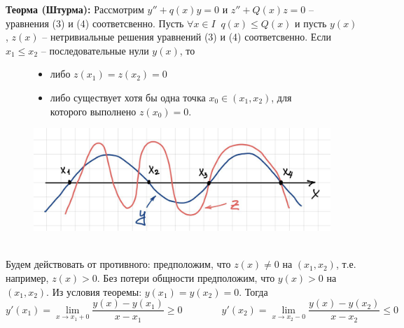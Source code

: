 \textbf{Теорма (Штурма):} Рассмотрим $y''+q(x)y=0$ и $z''+Q(x)z=0$ -- уравнения (3) и (4) соответсвенно.
\newline Пусть $\forall x\in I \;\; q(x)\leqslant Q(x)$ и пусть $y(x)$, $z(x)$ --
нетривиальные решения уравнений (3) и (4) соответсвенно.  Если $x_1 \leqslant x_2$ -- последовательные нули $y(x)$, то 
\begin{figure}[h]
    \hspace{-4ex}
    \begin{minipage}[h]{0.5\linewidth}
    \vspace{-2ex}
    \begin{itemize}
        \item либо $z(x_1) = z(x_2) = 0$
        \item либо существует хотя бы одна \newline точка $x_0 \in (x_1, x_2)$, для которого \newline выполнено $z(x_0) = 0$.
    \end{itemize}
    \end{minipage}
    \hspace{-4ex}
    \begin{minipage}[h]{0.5\linewidth}
    \vspace{-2ex}
    \begin{center}
    \includegraphics[width=1\linewidth]{images/shturma.jpg}
\end{center}
    \end{minipage}
\end{figure}
\\
\Proof Будем действовать от противного: предположим, что $z(x) \neq 0$ на $(x_1, x_2)$, т.е. например, $z(x) > 0$.
\newline Без потери общности предположим, что $y(x) > 0$ на $(x_1,x_2)$. Из условия теоремы: $y(x_1)=y(x_2)=0$. Тогда
\begin{equation*}
    y'(x_1)=\lim\limits_{x\to x_1+0}\frac{y(x)-y(x_1)}{x-x_1}\geqslant 0
    \qquad \qquad y'(x_2)=\lim\limits_{x\to x_2-0}\frac{y(x)-y(x_2)}{x-x_2}\leqslant 0
\end{equation*}
